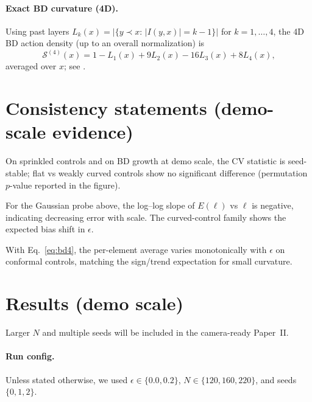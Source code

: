 \paragraph{Exact BD curvature (4D).}
Using past layers $L_k(x)=|\{y\prec x:\,|I(y,x)|=k-1\}|$ for $k=1,\dots,4$, the 4D BD action density (up to an overall normalization) is
\begin{equation}
\label{eq:bd4}
\mathcal{S}^{(4)}(x)=1 - L_1(x) + 9 L_2(x) - 16 L_3(x) + 8 L_4(x),
\end{equation}
averaged over $x$; see \citet{BenincasaDowker2010,Glaser2011DICE}.

\section{Consistency statements (demo-scale evidence)}
\begin{proposition}
On sprinkled controls and on BD growth at demo scale, the CV statistic is seed-stable; flat vs weakly curved controls show no significant difference (permutation $p$-value reported in the figure).
\end{proposition}

\begin{proposition}
For the Gaussian probe above, the log--log slope of $E(\ell)$ vs $\ell$ is negative, indicating decreasing error with scale.
The curved-control family shows the expected bias shift in $\epsilon$.
\end{proposition}

\begin{proposition}
With Eq.~\eqref{eq:bd4}, the per-element average varies monotonically with $\epsilon$ on conformal controls, matching the sign/trend expectation for small curvature.
\end{proposition}

\section{Results (demo scale)}
Larger $N$ and multiple seeds will be included in the camera-ready Paper~II.

\paragraph{Run config.}
Unless stated otherwise, we used $\epsilon\in\{0.0, 0.2\}$, $N\in\{120,160,220\}$, and seeds $\{0,1,2\}$.

